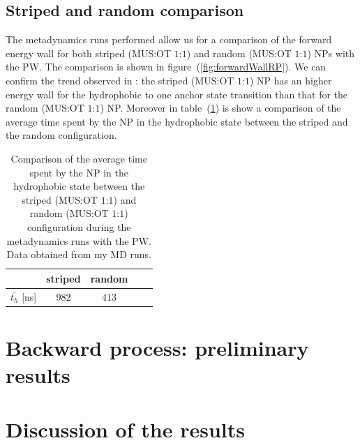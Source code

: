 \subsection{Striped and random comparison}
The metadynamics runs performed allow us for a comparison of the forward energy wall for both striped (\ac{MUS}:\ac{OT} $1$:$1$) and random (\ac{MUS}:\ac{OT} $1$:$1$) \acp{NP} with the \ac{PW}. The comparison is shown in figure~(\ref{fig:forwardWallRP}). We can confirm the trend observed in \cite{ourPaper}: the striped (\ac{MUS}:\ac{OT} $1$:$1$) \ac{NP} has an higher energy wall for the hydrophobic to one anchor state transition than that for the random (\ac{MUS}:\ac{OT} $1$:$1$) \ac{NP}. Moreover in table~(\ref{tab:hydroTimeRP}) is show a comparison of the average time spent by the \ac{NP} in the hydrophobic state between the striped and the random configuration.
\begin{table}[h!t]
	\centering
	\begin{tabular}{lcccc}
		\toprule
		\,					& striped	& random	\\ \toprule
	$\overline{t_{h}}$ [ns]	& $982$ 	& $413$		\\ \bottomrule
	\end{tabular}
	\caption{Comparison of the average time spent by the \acs{NP} in the hydrophobic state between the striped (\acs{MUS}:\acs{OT} $1$:$1$) and random (\acs{MUS}:\acs{OT} $1$:$1$) configuration during the metadynamics runs with the \acs{PW}. Data obtained from my \acs{MD} runs.}
	\label{tab:hydroTimeRP}
\end{table}

 
\section{Backward process: preliminary results}


\section{Discussion of the results}


